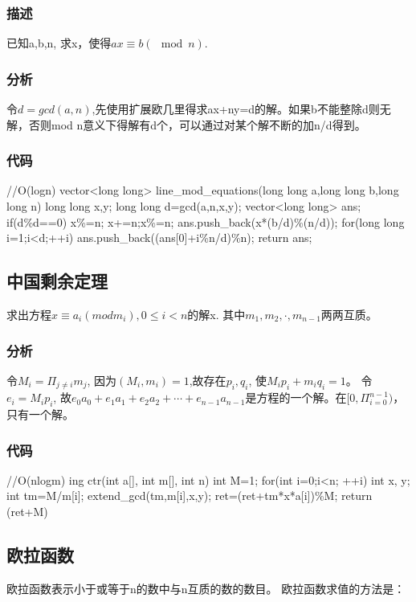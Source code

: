 \subsubsection{描述}
已知a,b,n, 求x，使得$ax\equiv b(\mod n)$.

\subsubsection{分析}
令$d=gcd(a,n)$,先使用扩展欧几里得求ax+ny=d的解。如果b不能整除d则无解，否则mod n意义下得解有d个，可以通过对某个解不断的加n/d得到。

\subsubsection{代码}
\begin{Codex}[label=line_mod.c]
	//O(logn)
	vector<long long> line_mod_equations(long long a,long long b,long long n){
		long long x,y;
		long long d=gcd(a,n,x,y);
		vector<long long> ans;
		if(d\%d==0){
			x\%=n; x+=n;x\%=n;
			ans.push_back(x*(b/d)\%(n/d));
			for(long long i=1;i<d;++i)
				ans.push_back((ans[0]+i\%n/d)\%n);
		}
		return ans;
	}
\end{Codex}

\subsection{中国剩余定理}
求出方程$x\equiv a_i(mod m_i),0 \leq i<n$的解x.
其中$m_1,m_2,\cdot,m_{n-1}$两两互质。

\subsubsection{分析}
令$M_i=\Pi_{j\neq i}m_j$, 因为$(M_i,m_i)=1$,故存在$p_i,q_i$, 使$M_ip_i+m_iq_i=1$。
令$e_i=M_ip_i$, 故$e_0a_0+e_1a_1+e_2a_2+\cdots+e_{n-1}a_{n-1}$是方程的一个解。在$[0,\Pi_{i=0}^{n-1})$，只有一个解。

\subsubsection{代码}
\begin{Codex}[label=ctr.c]
	//O(nlogm)
	ing ctr(int a[], int m[], int n){
		int M=1;
		for(int i=0;i<n; ++i){
			int x, y;
			int tm=M/m[i];
			extend_gcd(tm,m[i],x,y);
			ret=(ret+tm*x*a[i])\%M;
		}
		return (ret+M)%
	}
\end{Codex}

\subsection{欧拉函数}
欧拉函数表示小于或等于n的数中与n互质的数的数目。
欧拉函数求值的方法是：

